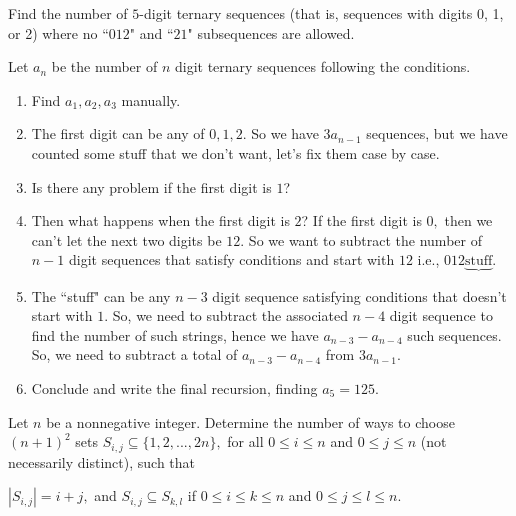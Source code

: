 \documentclass[11pt][mast]{lucky}
\begin{document}
\begin{exam}
Find the number of $5$-digit ternary sequences (that is, sequences with digits 0, 1, or 2) where no ``$012$" and ``$21$" subsequences are allowed.
\end{exam}

\begin{walk}
Let $a_n$ be the number of $n$ digit ternary sequences following the conditions.
\begin{enumerate}
\item Find $a_1, a_2, a_3$ manually.
\item The first digit can be any of $0, 1, 2.$ So we have $3a_{n-1}$ sequences, but we have counted some stuff that we don't want, let's fix them case by case.
\item Is there any problem if the first digit is $1$? 
\item Then what happens when the first digit is $2$?
If the first digit is $0,$ then we can't let the next two digits be $12$. So we want to subtract the number of $n-1$ digit sequences that satisfy conditions and start with $12$ i.e., $012\underbrace{\text{stuff}}.$
\item The ``stuff" can be any $n-3$ digit sequence satisfying conditions that doesn't start with $1$. So, we need to subtract the associated $n-4$ digit sequence to find the number of such strings, hence we have $a_{n-3} - a_{n-4}$ such sequences.
So, we need to subtract a total of $a_{n-3} - a_{n-4}$ from $3a_{n-1}.$  
\item Conclude and write the final recursion, finding $a_5 = 125.$
\end{enumerate}
\end{walk}








%
%


\begin{exam}
[USAJMO 2019/5] Let $n$ be a nonnegative integer. Determine the number of ways to choose $(n+1)^2$ sets $S_{i,j} \subseteq \{1, 2, . . . , 2n\},$
for all $0 \leq i \leq n$ and $0 \leq j \leq n$ (not necessarily distinct), such that
\begin{itemize}
\Item $|S_{i,j}| = i + j,$ and
\Item $S_{i,j} \subseteq S_{k,l}$ if $0 \leq i \leq k \leq n$ and $0 \leq j \leq l \leq n.$
\end{itemize}
\end{exam}
\end{document}
